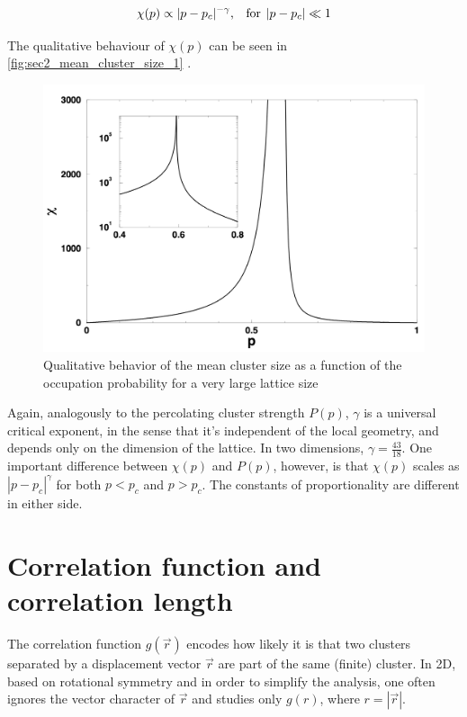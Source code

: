 $$ 
    \chi(p) \propto  |p - p_c|^{-\gamma} \textrm{,} \hspace{0.35cm}  \textrm{for} \hspace{0.15cm} |p - p_c| \ll 1 
$$ 

The qualitative behaviour of $\chi(p)$ can be seen in \autoref{fig:sec2_mean_cluster_size_1}
.

\begin{figure}[H]
  \includegraphics[width=\linewidth]{Images/mean_cluster_size_1.png}
  \caption{Qualitative behavior of the mean cluster size as a function of the occupation probability for a very large lattice size}
  \label{fig:sec2_mean_cluster_size_1}
\end{figure}


Again, analogously to the percolating cluster strength $P(p)$, $\gamma$ is a universal critical exponent, in the sense that it's independent of the local geometry, and depends only on the dimension of the lattice. In two dimensions, $\gamma = \frac{43}{18}$\cite{intro_to_percolation_theory}. One important difference between $\chi(p)$ and $P(p)$, however, is that $\chi(p)$ scales as $|p - p_c|^\gamma$ for both $p < p_c$ and $p > p_c$. The constants of proportionality are different in either side.


\section{Correlation function and correlation length} 

The correlation function $g(\vec{r})$ encodes how likely it is that two clusters separated by a displacement vector $\vec{r}$ are part of the same (finite) cluster. In 2D,  based on rotational symmetry and in order to simplify the analysis, one often ignores the vector character of  $\vec{r}$ and studies only $g(r)$, where $r = |\vec{r}|$.


